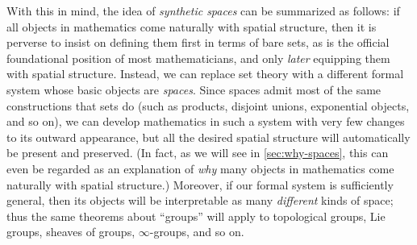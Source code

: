 \documentclass[10pt]{article}
\def\oo{\ensuremath{\infty}}
\numberwithin{equation}{section}
\begin{document}
With this in mind, the idea of \emph{synthetic spaces} can be summarized as follows:
if all objects in mathematics come naturally with spatial structure, then it is perverse to insist on defining them first in terms of bare sets, as is the official foundational position of most mathematicians, and only \emph{later} equipping them with spatial structure. %
Instead, we can replace set theory with a different formal system whose basic objects are \emph{spaces}. %
Since spaces admit most of the same constructions that sets do (such as products, disjoint unions, exponential objects, and so on), we can develop mathematics in such a system with very few changes to its outward appearance, but all the desired spatial structure will automatically be present and preserved.
(In fact, as we will see in \cref{sec:why-spaces}, this can even be regarded as an explanation of \emph{why} many objects in mathematics come naturally with spatial structure.)
Moreover, if our formal system is sufficiently general, then its objects will be interpretable as many \emph{different} kinds of space; thus the same theorems about ``groups'' will apply to topological groups, Lie groups, sheaves of groups, \oo-groups, and so on.
\end{document}
